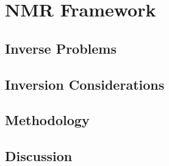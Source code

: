 
\chapter{NMR Framework}
\label{ch:03framework}

\FloatBarrier
\section{Inverse Problems}
\label{sec:inverse}


\FloatBarrier
\section{Inversion Considerations}
\label{sec:consider}


\FloatBarrier
\section{Methodology}
\label{sec:method}


\FloatBarrier
\section{Discussion}
\label{sec:discuss03}